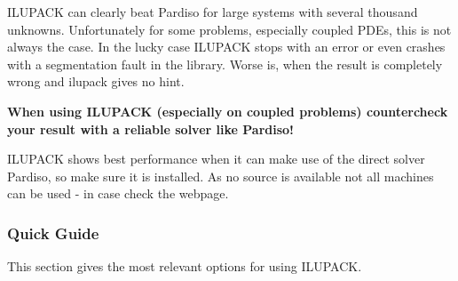 ILUPACK can clearly beat Pardiso for large systems with several thousand unknowns. Unfortunately for some problems, especially coupled PDEs, this is 
not always the case. In the lucky case ILUPACK stops with an error or even crashes with a segmentation fault in the library. Worse is, when the result is completely wrong and ilupack gives no hint.

\textbf{When using ILUPACK (especially on coupled problems) countercheck your result with a reliable solver like Pardiso!}

ILUPACK shows best performance when it can make use of the direct solver
Pardiso, so make sure it is installed. As no source is available not all
machines can be used - in case check the webpage.

\subsubsection*{Quick Guide}
This section gives the most relevant options for using ILUPACK.
